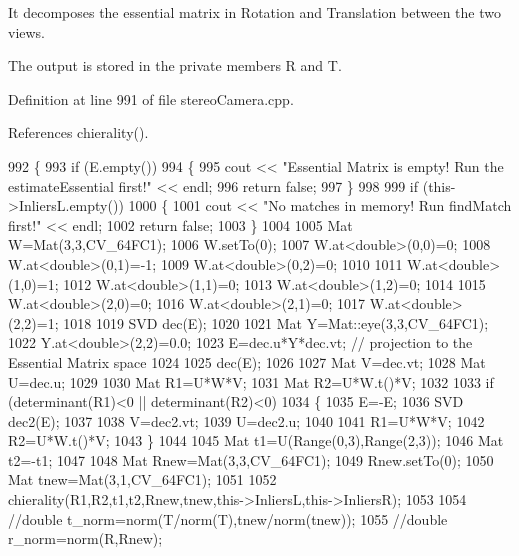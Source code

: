 It decomposes the essential matrix in Rotation and Translation between the two views. 

The output is stored in the private members R and T. 

Definition at line 991 of file stereo\+Camera.\+cpp.



References chierality().


\begin{DoxyCode}
992 \{
993     \textcolor{keywordflow}{if} (E.empty())
994     \{
995         cout << \textcolor{stringliteral}{"Essential Matrix is empty! Run the estimateEssential first!"} << endl;
996         \textcolor{keywordflow}{return} \textcolor{keyword}{false};
997     \}
998     
999     \textcolor{keywordflow}{if} (this->InliersL.empty())
1000     \{
1001         cout << \textcolor{stringliteral}{"No matches in memory! Run findMatch first!"} << endl;
1002         \textcolor{keywordflow}{return} \textcolor{keyword}{false};
1003     \}
1004 
1005     Mat W=Mat(3,3,CV\_64FC1);
1006     W.setTo(0);
1007     W.at<\textcolor{keywordtype}{double}>(0,0)=0;
1008     W.at<\textcolor{keywordtype}{double}>(0,1)=-1;
1009     W.at<\textcolor{keywordtype}{double}>(0,2)=0;
1010 
1011     W.at<\textcolor{keywordtype}{double}>(1,0)=1;
1012     W.at<\textcolor{keywordtype}{double}>(1,1)=0;
1013     W.at<\textcolor{keywordtype}{double}>(1,2)=0;
1014 
1015     W.at<\textcolor{keywordtype}{double}>(2,0)=0;
1016     W.at<\textcolor{keywordtype}{double}>(2,1)=0;
1017     W.at<\textcolor{keywordtype}{double}>(2,2)=1;
1018 
1019     SVD dec(E);
1020     
1021     Mat Y=Mat::eye(3,3,CV\_64FC1);
1022     Y.at<\textcolor{keywordtype}{double}>(2,2)=0.0;
1023     E=dec.u*Y*dec.vt; \textcolor{comment}{// projection to the Essential Matrix space}
1024     
1025     dec(E);
1026 
1027     Mat V=dec.vt;
1028     Mat U=dec.u;
1029 
1030     Mat R1=U*W*V;
1031     Mat R2=U*W.t()*V;
1032     
1033     \textcolor{keywordflow}{if} (determinant(R1)<0 || determinant(R2)<0)
1034     \{
1035         E=-E;
1036         SVD dec2(E);
1037 
1038         V=dec2.vt;
1039         U=dec2.u;
1040         
1041         R1=U*W*V;
1042         R2=U*W.t()*V;
1043     \}
1044 
1045     Mat t1=U(Range(0,3),Range(2,3));
1046     Mat t2=-t1;
1047 
1048     Mat Rnew=Mat(3,3,CV\_64FC1);
1049     Rnew.setTo(0);
1050     Mat tnew=Mat(3,1,CV\_64FC1);
1051 
1052     chierality(R1,R2,t1,t2,Rnew,tnew,this->InliersL,this->InliersR);
1053     
1054     \textcolor{comment}{//double t\_norm=norm(T/norm(T),tnew/norm(tnew));}
1055     \textcolor{comment}{//double r\_norm=norm(R,Rnew);}

\end{DoxyCode}
